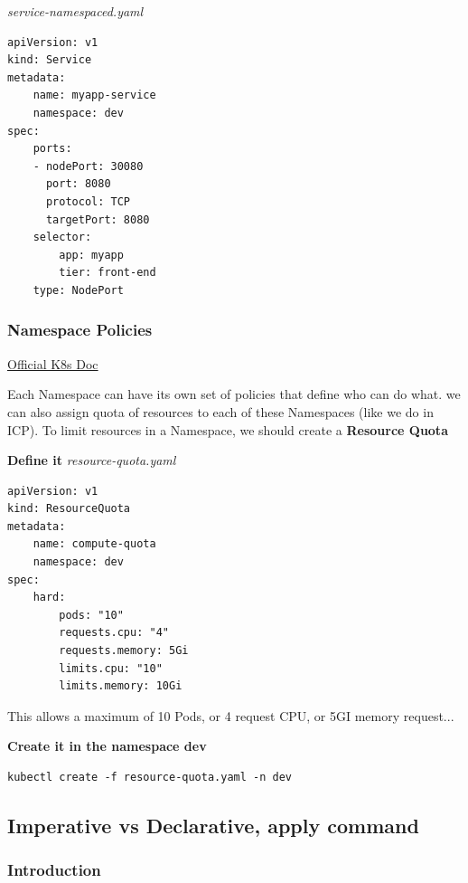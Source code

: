 \documentclass{article}
\newenvironment{codetemplate}[1][]{%
  \mybasecolorbox[#1]
  \itshape
}{%
  \endmybasecolorbox
}
\begin{document}
\begin{codetemplate}{service-namespaced.yaml}
\begin{verbatim}
apiVersion: v1
kind: Service
metadata:
    name: myapp-service
    namespace: dev
spec:
    ports:
    - nodePort: 30080
      port: 8080
      protocol: TCP
      targetPort: 8080
    selector:
        app: myapp
        tier: front-end
    type: NodePort 
\end{verbatim}
\end{codetemplate}

\subsubsection{Namespace Policies}

\href{https://kubernetes.io/docs/concepts/policy/resource-quotas/}{Official K8s Doc}

\label{Quota}
Each Namespace can have its own set of policies that define who can do what. we can also assign quota of resources to each of these Namespaces (like we do in ICP). To limit resources in a Namespace, we should create a \textbf{Resource Quota}

\textbf{Define it}
\begin{codetemplate}{resource-quota.yaml}
\begin{verbatim}
apiVersion: v1
kind: ResourceQuota
metadata:
    name: compute-quota
    namespace: dev
spec:
    hard:
        pods: "10"
        requests.cpu: "4"
        requests.memory: 5Gi
        limits.cpu: "10"
        limits.memory: 10Gi
\end{verbatim}
\end{codetemplate}

This allows a maximum of 10 Pods, or 4 request CPU, or 5GI memory request...

\textbf{Create it in the namespace dev}
\begin{codetemplate}{}
\begin{verbatim}
kubectl create -f resource-quota.yaml -n dev
\end{verbatim}
\end{codetemplate}

\subsection{Imperative vs Declarative, apply command}

\subsubsection{Introduction}
\end{document}
